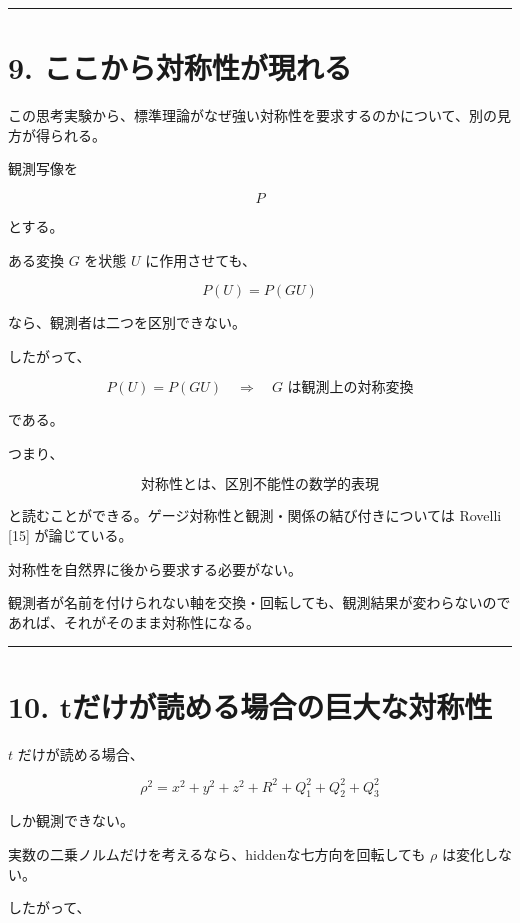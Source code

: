 \documentclass[
  a4paper,
]{ltjsarticle}
\begin{document}
\begin{center}\rule{0.5\linewidth}{0.5pt}\end{center}

\section{9.
ここから対称性が現れる}\label{ux3053ux3053ux304bux3089ux5bfeux79f0ux6027ux304cux73feux308cux308b}

この思考実験から、標準理論がなぜ強い対称性を要求するのかについて、別の見方が得られる。

観測写像を

\[
P
\]

とする。

ある変換 \(G\) を状態 \(U\) に作用させても、

\[
P(U)=P(GU)
\]

なら、観測者は二つを区別できない。

したがって、

\[
\boxed{
P(U)=P(GU)
\quad\Longrightarrow\quad
G\text{ は観測上の対称変換}
}
\]

である。

つまり、

\[
\boxed{
\text{対称性とは、区別不能性の数学的表現}
}
\]

と読むことができる。ゲージ対称性と観測・関係の結び付きについては Rovelli
{[}15{]} が論じている。

対称性を自然界に後から要求する必要がない。

観測者が名前を付けられない軸を交換・回転しても、観測結果が変わらないのであれば、それがそのまま対称性になる。

\begin{center}\rule{0.5\linewidth}{0.5pt}\end{center}

\section{10.
tだけが読める場合の巨大な対称性}\label{tux3060ux3051ux304cux8aadux3081ux308bux5834ux5408ux306eux5de8ux5927ux306aux5bfeux79f0ux6027}

\(t\) だけが読める場合、

\[
\rho^2=
x^2+y^2+z^2+R^2+Q_1^2+Q_2^2+Q_3^2
\]

しか観測できない。

実数の二乗ノルムだけを考えるなら、hiddenな七方向を回転しても \(\rho\)
は変化しない。

したがって、
\end{document}
